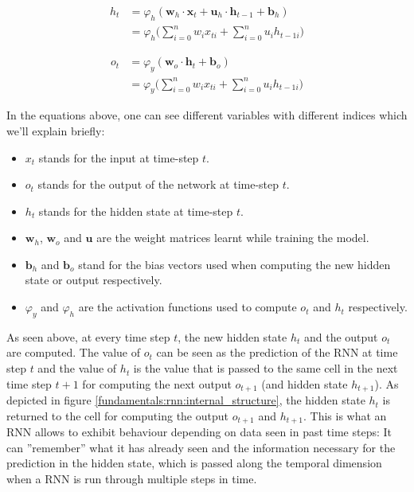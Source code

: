 \begin{equation}
\begin{split}
h_t & = \varphi_h(\mathbf{w}_h \cdot \mathbf{x}_t + \mathbf{u}_h \cdot \mathbf{h}_{t-1} + \mathbf{b}_h) \\
    & = \varphi_h\bigg(\sum_{i=0}^{n} w_i x_{ti} + \sum_{i=0}^{n} u_i h_{t-1i}\bigg)
\end{split}
\label{fundamentals:rnn:forward_equation:hidden}
\end{equation}

\begin{equation}
\begin{split}
o_t & = \varphi_y(\mathbf{w}_o \cdot \mathbf{h}_t + \mathbf{b}_o) \\
    & = \varphi_y\bigg(\sum_{i=0}^{n} w_i x_{ti} + \sum_{i=0}^{n} u_i h_{t-1i}\bigg)
\end{split}
\label{fundamentals:rnn:forward_equation:output}
\end{equation}

In the equations above, one can see different variables with different indices which we'll explain briefly:

\begin{itemize}[noitemsep]
	\item $x_t$ stands for the input at time-step $t$.
	\item $o_t$ stands for the output of the network at time-step $t$.
	\item $h_t$ stands for the hidden state at time-step $t$.
	\item $\mathbf{w}_h$, $\mathbf{w}_o$ and $\mathbf{u}$ are the weight matrices learnt while training the model.
	\item $\mathbf{b}_h$ and $\mathbf{b}_o$ stand for the bias vectors used when computing the new hidden state or output respectively.
	\item $\varphi_y$ and $\varphi_h$ are the activation functions used to compute $o_t$ and $h_t$ respectively.
\end{itemize}

As seen above, at every time step $t$, the new hidden state $h_t$ and the output $o_t$ are computed. The value of $o_t$ can be seen as the prediction of the RNN at time step $t$ and the value of $h_t$ is the value that is passed to the same cell in the next time step $t+1$ for computing the next output $o_{t+1}$ (and hidden state $h_{t+1}$). As depicted in figure \ref{fundamentals:rnn:internal_structure}, the hidden state $h_t$ is returned to the cell for computing the output $o_{t+1}$ and $h_{t+1}$. This is what an RNN allows to exhibit behaviour depending on data seen in past time steps: It can ''remember'' what it has already seen and the information necessary for the prediction in the hidden state, which is passed along the temporal dimension when a RNN is run through multiple steps in time.

